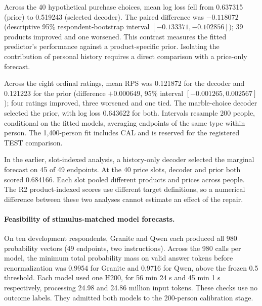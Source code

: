 \documentclass[10pt,twocolumn]{article}
\begin{document}
Across the 40 hypothetical purchase choices, mean log loss fell from
0.637315 (prior) to 0.519243 (selected decoder). The paired difference
was $-0.118072$ (descriptive 95\% respondent-bootstrap interval
$[-0.133371,-0.102856]$); 39 products improved and one worsened.
This contrast measures the fitted predictor's performance against a
product-specific prior. Isolating the contribution of personal history
requires a direct comparison with a price-only forecast.

Across the eight ordinal ratings, mean RPS was 0.121872 for the decoder
and 0.121223 for the prior (difference $+0.000649$,
95\% interval $[-0.001265,0.002567]$); four ratings improved, three
worsened and one tied. The marble-choice decoder selected the prior, with
log loss 0.643622 for both. Intervals resample 200 people, conditional on
the fitted models, averaging endpoints of the same type within person.
The 1,400-person fit includes CAL and is reserved for the registered TEST
comparison.

In the earlier, slot-indexed analysis, a history-only decoder selected
the marginal forecast on 45 of 49 endpoints. At the 40 price slots,
decoder and prior both scored 0.684166. Each slot pooled different
products and prices across people. The R2 product-indexed scores use
different target definitions, so a numerical difference between these
two analyses cannot estimate an effect of the repair.

\paragraph{Feasibility of stimulus-matched model forecasts.}
On ten development respondents, Granite and Qwen each produced all 980
probability vectors (49 endpoints, two instructions). Across the 980 calls
per model, the minimum total probability mass on valid answer tokens before
renormalization was 0.9954 for Granite and 0.9716 for Qwen, above the
frozen 0.5 threshold. Each model used one H200, for 56 min 24 s and
45 min 1 s respectively, processing 24.98 and 24.86 million input
tokens. These checks use no outcome labels. They admitted both models to
the 200-person calibration stage.
\end{document}
